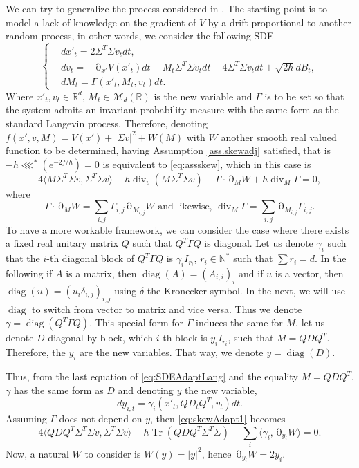 \documentclass[12pt]{amsart}
\newcommand{\diag}{\operatorname{diag}}
\newcommand{\N}{\mathbb N}
\newcommand{\R}{\mathbb R}
\newcommand{\Tr}{{\operatorname{Tr}}}
\renewcommand{\div}{\operatorname{div}}
\def\<{\langle}
\def\>{\rangle}
\numberwithin{equation}{section}
\numberwithin{figure}{section}
\DeclareMathOperator{\p}{\partial}
\def\Mr{{\mathscr M}}\def\Nr{{\mathscr N}}\def\Or{{\mathscr O}}\def\Pr{{\mathscr P}}
\begin{document}
We can try to generalize the process considered in \cite{LeSaSt20}. The starting point is to model a lack of knowledge on the gradient of $V$ by a drift proportional to another random process, in other words, we consider the following SDE
\begin{equation}\label{eq:SDEAdaptLang}
\left\{
\begin{aligned}
&dx'_t = 2\Sigma^T\Sigma v_tdt,\\
&dv_t = -\p_{x'}V(x'_t)dt - M_t\Sigma^T\Sigma v_tdt - 4\Sigma^T\Sigma v_tdt + \sqrt{2h}dB_t,\\
&dM_t = \Gamma(x'_t,M_t,v_t)dt.
\end{aligned}
\right.
\end{equation}
Where $x'_t,v_t\in\R^d$, $M_t\in\Mr_d(\R)$ is the new variable and $\Gamma$ is to be set so that the system admits an invariant probability measure with the same form as the standard Langevin process. Therefore, denoting $f(x',v,M) = V(x') + |\Sigma v|^2 + W(M)$ with $W$ another smooth real valued function to be determined, having Assumption \ref{ass.skewadj} satisfied, that is $-h\lll^*(e^{-2f/h}) = 0$ is equivalent to \eqref{eq:assskew}, which in this case is
\begin{equation}\label{eq:skewAdapt1}
4\<M\Sigma^T\Sigma v,\Sigma^T\Sigma v\> - h\div_v(M\Sigma^T\Sigma v) -\Gamma\cdot\p_M W + h\div_M\Gamma = 0,
\end{equation}
where
\begin{equation*}
\Gamma \cdot \p_MW = \sum_{i,j}\Gamma_{i,j}\p_{M_{i,j}}W \text{ and likewise, }\div_M\Gamma = \sum_{i,j}\p_{M_{i,j}}\Gamma_{i,j}.
\end{equation*}
To have a more workable framework, we can consider the case where there exists a fixed real unitary matrix $Q$ such that $Q^T\Gamma Q$ is diagonal. Let us denote $\gamma_i$ such that the $i$-th diagonal block of $Q^T\Gamma Q$ is $\gamma_iI_{r_i}$, $r_i\in\N^*$ such that $\sum r_i = d$. In the following if $A$ is a matrix, then $\diag(A) = (A_{i,i})_i$ and if $u$ is a vector, then $\diag(u) = (u_i\delta_{i,j})_{i,j}$ using $\delta$ the Kronecker symbol. In the next, we will use $\diag$ to switch from vector to matrix and vice versa. Thus we denote $\gamma = \diag(Q^T\Gamma Q)$. This special form for $\Gamma$ induces the same for $M$, let us denote $D$ diagonal by block, which $i$-th block is $y_iI_{r_i}$, such that $M = QDQ^T$. Therefore, the $y_i$ are the new variables. That way, we denote $y = \diag(D)$.

Thus, from the last equation of \eqref{eq:SDEAdaptLang} and the equality $M = QDQ^T$, $\gamma$ has the same form as $D$ and denoting $y$ the new variable,
\begin{equation*}
dy_{i,t} = \gamma_i(x'_t,QD_tQ^T,v_t)dt.
\end{equation*}
Assuming $\Gamma$ does not depend on $y$, then \eqref{eq:skewAdapt1} becomes
\begin{equation}\label{eq:skewAdapt2}
4\<QDQ^T\Sigma^T\Sigma v,\Sigma^T\Sigma v\> - h\Tr(QDQ^T\Sigma^T\Sigma) - \sum_i\<\gamma_i, \p_{y_i}W\> = 0.
\end{equation}
Now, a natural $W$ to consider is $W(y) = |y|^2$, hence $\p_{y_i}W = 2y_i$.
\end{document}
